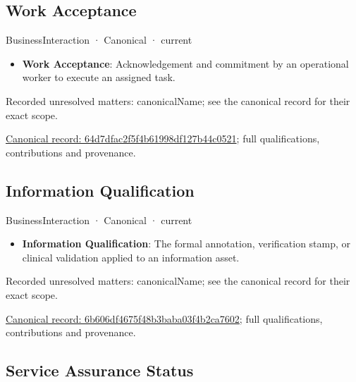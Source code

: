\subsection{Work Acceptance}

\label{element:64d7dfac2f5f4b61998df127b44c0521}
{\small BusinessInteraction · Canonical · current}\par

\begin{itemize}


\item \textbf{Work Acceptance}: Acknowledgement and commitment by an operational worker to execute an assigned task.

\end{itemize}

{\small Recorded unresolved matters: canonicalName; see the canonical record for their exact scope.}\par
{\footnotesize \href{../../../../continuum/business/business-interaction/64d7dfac2f5f4b61998df127b44c0521.md}{Canonical record: 64d7dfac2f5f4b61998df127b44c0521}; full qualifications, contributions and provenance.}\par
\subsection{Information Qualification}

\label{element:6b606df4675f48b3baba03f4b2ca7602}
{\small BusinessInteraction · Canonical · current}\par

\begin{itemize}


\item \textbf{Information Qualification}: The formal annotation, verification stamp, or clinical validation applied to an information asset.

\end{itemize}

{\small Recorded unresolved matters: canonicalName; see the canonical record for their exact scope.}\par
{\footnotesize \href{../../../../continuum/business/business-interaction/6b606df4675f48b3baba03f4b2ca7602.md}{Canonical record: 6b606df4675f48b3baba03f4b2ca7602}; full qualifications, contributions and provenance.}\par
\subsection{Service Assurance Status}

